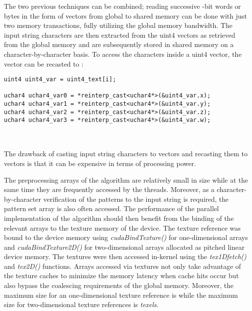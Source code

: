 \documentclass{ws-ijait}
\begin{document}
The two previous techniques can be combined; reading  successive -bit words or  bytes in the form of   vectors from global to shared memory can be done with just two memory transactions, fully utilizing the global memory bandwidth. The input string characters are then extracted from the uint4 vectors as retrieved from the global memory and are subsequently stored in shared memory on a character-by-character basis. To access the characters inside a uint4 vector, the vector can be recasted to :

\noindent\begin{minipage}{\textwidth}
\begin{lstlisting}	
uint4 uint4_var = uint4_text[i];

uchar4 uchar4_var0 = *reinterp_cast<uchar4*>(&uint4_var.x);
uchar4 uchar4_var1 = *reinterp_cast<uchar4*>(&uint4_var.y);
uchar4 uchar4_var2 = *reinterp_cast<uchar4*>(&uint4_var.z);
uchar4 uchar4_var3 = *reinterp_cast<uchar4*>(&uint4_var.w);
		
\end{lstlisting}
\end{minipage}\\

The drawback of casting input string characters to  vectors and recasting them to  vectors is that it can be expensive in terms of processing power.

The preprocessing arrays of the algorithm are relatively small in size while at the same time they are frequently accessed by the threads. Moreover, as a character-by-character verification of the patterns to the input string is required, the pattern set array is also often accessed. The performance of the parallel implementation of the algorithm should then benefit from the binding of the relevant arrays to the texture memory of the device. The texture reference was bound to the device memory using \textit{cudaBindTexture()} for one-dimensional arrays and \textit{cudaBindTexture2D()} for two-dimensional arrays allocated as pitched linear device memory. The textures were then accessed in-kernel using the \textit{tex1Dfetch()} and \textit{tex2D()} functions. Arrays accessed via textures not only take advantage of the texture caches to minimize the memory latency when cache hits occur but also bypass the coalescing requirements of the global memory. Moreover, the maximum size for an one-dimensional texture reference is  while the maximum size for two-dimensional texture references is  \textit{texels}.

\clearpage
\end{document}
